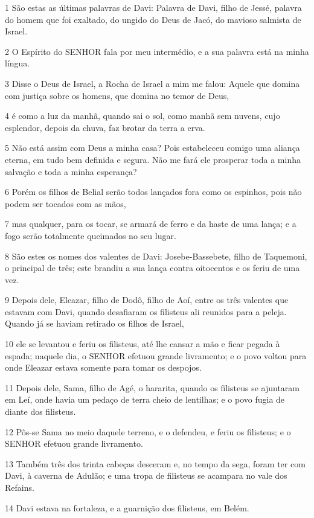 \par 1 São estas as últimas palavras de Davi: Palavra de Davi, filho de Jessé, palavra do homem que foi exaltado, do ungido do Deus de Jacó, do mavioso salmista de Israel.
\par 2 O Espírito do SENHOR fala por meu intermédio, e a sua palavra está na minha língua.
\par 3 Disse o Deus de Israel, a Rocha de Israel a mim me falou: Aquele que domina com justiça sobre os homens, que domina no temor de Deus,
\par 4 é como a luz da manhã, quando sai o sol, como manhã sem nuvens, cujo esplendor, depois da chuva, faz brotar da terra a erva.
\par 5 Não está assim com Deus a minha casa? Pois estabeleceu comigo uma aliança eterna, em tudo bem definida e segura. Não me fará ele prosperar toda a minha salvação e toda a minha esperança?
\par 6 Porém os filhos de Belial serão todos lançados fora como os espinhos, pois não podem ser tocados com as mãos,
\par 7 mas qualquer, para os tocar, se armará de ferro e da haste de uma lança; e a fogo serão totalmente queimados no seu lugar.
\par 8 São estes os nomes dos valentes de Davi: Josebe-Bassebete, filho de Taquemoni, o principal de três; este brandiu a sua lança contra oitocentos e os feriu de uma vez.
\par 9 Depois dele, Eleazar, filho de Dodô, filho de Aoí, entre os três valentes que estavam com Davi, quando desafiaram os filisteus ali reunidos para a peleja. Quando já se haviam retirado os filhos de Israel,
\par 10 ele se levantou e feriu os filisteus, até lhe cansar a mão e ficar pegada à espada; naquele dia, o SENHOR efetuou grande livramento; e o povo voltou para onde Eleazar estava somente para tomar os despojos.
\par 11 Depois dele, Sama, filho de Agé, o hararita, quando os filisteus se ajuntaram em Leí, onde havia um pedaço de terra cheio de lentilhas; e o povo fugia de diante dos filisteus.
\par 12 Pôs-se Sama no meio daquele terreno, e o defendeu, e feriu os filisteus; e o SENHOR efetuou grande livramento.
\par 13 Também três dos trinta cabeças desceram e, no tempo da sega, foram ter com Davi, à caverna de Adulão; e uma tropa de filisteus se acampara no vale dos Refains.
\par 14 Davi estava na fortaleza, e a guarnição dos filisteus, em Belém.
